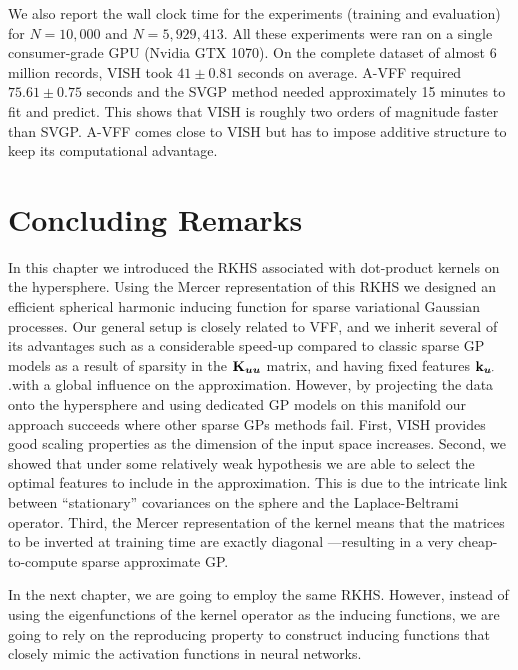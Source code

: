 We also report the wall clock time for the experiments (training and evaluation) for $N=10,000$ and $N=5,929,413$. All these experiments were ran on a single consumer-grade GPU (Nvidia GTX 1070). On the complete dataset of almost 6 million records, VISH took $41\pm0.81$ seconds on average. A-VFF required $75.61\pm0.75$ seconds and the SVGP method needed approximately 15 minutes to fit and predict. This shows that VISH is roughly two orders of magnitude faster than SVGP. A-VFF comes close to VISH but has to impose additive structure to keep its computational advantage.


\section{Concluding Remarks}

In this chapter we introduced the RKHS associated with dot-product kernels on the hypersphere. Using the Mercer representation of this RKHS we designed an efficient spherical harmonic inducing function for sparse variational Gaussian processes. Our general setup is closely related to VFF, and we inherit several of its advantages such as a considerable speed-up compared to classic sparse GP models as a result of sparsity in the $\mathbf{{K}}_{\bm{u} \bm{u}}$ matrix, and having fixed features $\mathbf{k}_{\bm{u} \cdot}$ .with a global influence on the approximation. However, by projecting the data onto the hypersphere and using dedicated GP models on this manifold our approach succeeds where other sparse GPs methods fail. First, VISH provides good scaling properties as the dimension of the input space increases.  Second, we showed that under some relatively weak hypothesis we are able to select the optimal features to include in the approximation. This is due to the intricate link between ``stationary'' covariances on the sphere and the Laplace-Beltrami operator. Third, the Mercer representation of the kernel means that the matrices to be inverted at training time are exactly diagonal ---resulting in a very cheap-to-compute sparse approximate GP.

In the next chapter, we are going to employ the same RKHS. However, instead of using the eigenfunctions of the kernel operator as the inducing functions, we are going to rely on the reproducing property to construct inducing functions that closely mimic the activation functions in neural networks.